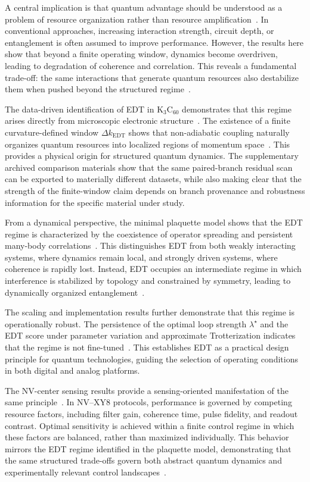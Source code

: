 ﻿\documentclass[aps,prx,reprint,superscriptaddress,longbibliography,floatfix]{revtex4-2}
\begin{document}
A central implication is that quantum advantage should be understood as a problem of resource organization rather than resource amplification~\cite{Preskill2018}. In conventional approaches, increasing interaction strength, circuit depth, or entanglement is often assumed to improve performance. However, the results here show that beyond a finite operating window, dynamics become overdriven, leading to degradation of coherence and correlation. This reveals a fundamental trade-off: the same interactions that generate quantum resources also destabilize them when pushed beyond the structured regime~\cite{Altman2015,Swingle2018}.

The data-driven identification of EDT in K$_3$C$_{60}$ demonstrates that this regime arises directly from microscopic electronic structure~\cite{Gunnarsson1997,Capone2009}. The existence of a finite curvature-defined window $\Delta k_{\mathrm{EDT}}$ shows that non-adiabatic coupling naturally organizes quantum resources into localized regions of momentum space~\cite{Mead1979,Yarkony1996}. This provides a physical origin for structured quantum dynamics. The supplementary archived comparison materials show that the same paired-branch residual scan can be exported to materially different datasets, while also making clear that the strength of the finite-window claim depends on branch provenance and robustness information for the specific material under study.

From a dynamical perspective, the minimal plaquette model shows that the EDT regime is characterized by the coexistence of operator spreading and persistent many-body correlations~\cite{Choi2016,KimHuse2013}. This distinguishes EDT from both weakly interacting systems, where dynamics remain local, and strongly driven systems, where coherence is rapidly lost. Instead, EDT occupies an intermediate regime in which interference is stabilized by topology and constrained by symmetry, leading to dynamically organized entanglement~\cite{Swingle2018}.

The scaling and implementation results further demonstrate that this regime is operationally robust. The persistence of the optimal loop strength $\lambda^\star$ and the EDT score under parameter variation and approximate Trotterization indicates that the regime is not fine-tuned~\cite{Lloyd1996,Childs2019}. This establishes EDT as a practical design principle for quantum technologies, guiding the selection of operating conditions in both digital and analog platforms.

The NV-center sensing results provide a sensing-oriented manifestation of the same principle~\cite{Degen2017,Barry2020}. In NV--XY8 protocols, performance is governed by competing resource factors, including filter gain, coherence time, pulse fidelity, and readout contrast. Optimal sensitivity is achieved within a finite control regime in which these factors are balanced, rather than maximized individually. This behavior mirrors the EDT regime identified in the plaquette model, demonstrating that the same structured trade-offs govern both abstract quantum dynamics and experimentally relevant control landscapes~\cite{Casola2018}.
\end{document}
